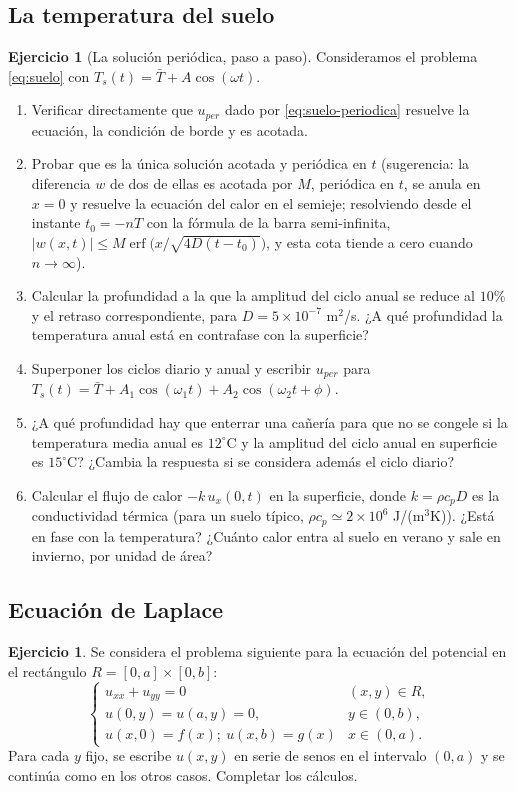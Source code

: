 \documentclass[12pt, a4paper]{amsbook}
\theoremstyle{remark}
\theoremstyle{definition}
\newtheorem{ejer}[teo]{Ejercicio}
\numberwithin{section}{chapter}
\numberwithin{subsection}{section}
\numberwithin{equation}{section}
\numberwithin{figure}{chapter}
\begin{document}
\subsection*{La temperatura del suelo}

\begin{ejer}[La solución periódica, paso a paso]\label{ejer:suelo-guiado}
Consideramos el problema \eqref{eq:suelo} con $T_s(t) = \bar T + A\cos(\omega t)$.
\begin{enumerate}
\item Verificar directamente que $u_{per}$ dado por \eqref{eq:suelo-periodica} resuelve la ecuación, la condición de borde y es acotada.
\item Probar que es la única solución acotada y periódica en $t$ (sugerencia: la diferencia $w$ de dos de ellas es acotada por $M$, periódica en $t$, se anula en $x=0$ y resuelve la ecuación del calor en el semieje; resolviendo desde el instante $t_0=-nT$ con la fórmula de la barra semi-infinita, $|w(x,t)|\le M\operatorname{erf}\bigl(x/\sqrt{4D(t-t_0)}\bigr)$, y esta cota tiende a cero cuando $n\to\infty$).
\item Calcular la profundidad a la que la amplitud del ciclo anual se reduce al $10\%$ y el retraso correspondiente, para $D = 5\times 10^{-7}$ m$^2$/s. ¿A qué profundidad la temperatura anual está en contrafase con la superficie?
\item Superponer los ciclos diario y anual y escribir $u_{per}$ para $T_s(t) = \bar T + A_1\cos(\omega_1 t) + A_2\cos(\omega_2 t + \phi)$.
\item ¿A qué profundidad hay que enterrar una cañería para que no se congele si la temperatura media anual es $12^\circ$C y la amplitud del ciclo anual en superficie es $15^\circ$C? ¿Cambia la respuesta si se considera además el ciclo diario?
\item Calcular el flujo de calor $-k\,u_x(0,t)$ en la superficie, donde $k=\rho c_p D$ es la conductividad térmica (para un suelo típico, $\rho c_p\simeq 2\times10^6$ J/(m$^3$K)). ¿Está en fase con la temperatura? ¿Cuánto calor entra al suelo en verano y sale en invierno, por unidad de área?
\end{enumerate}
\end{ejer}

\subsection*{Ecuación de Laplace}

\begin{ejer}
Se considera el problema siguiente para la ecuación del potencial en el rectángulo $R=[0,a]\times[0,b]$:
$$
\begin{cases}
u_{xx} + u_{yy} = 0 & (x,y)\in R,\\
u(0,y)=u(a,y)=0, & y\in (0,b),\\
u(x,0)=f(x);\ u(x,b)=g(x) & x\in (0,a). 
\end{cases}
$$
Para cada $y$ fijo, se escribe $u(x,y)$ en serie de senos en el intervalo $(0,a)$ y se continúa como en los otros casos. Completar los cálculos.
\end{ejer}
\end{document}
